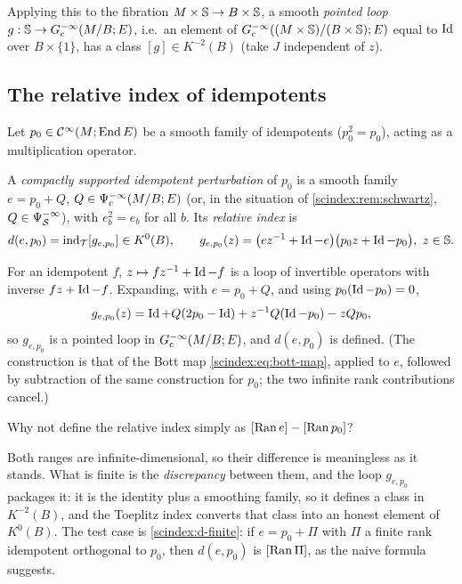 Applying this to the fibration $M\times\mathbb{S}\to B\times\mathbb{S}$, a smooth
\emph{pointed loop} $g:\mathbb{S}\to G^{-\infty}_{\mathrm c}(M/B;E)$, i.e.\ an element of
$G^{-\infty}_{\mathrm c}((M\times\mathbb{S})/(B\times\mathbb{S});E)$ equal to $\operatorname{Id}$ over
$B\times\{1\}$, has a class $[g]\in K^{-2}(B)$ (take $J$ independent of $z$).

\subsection{The relative index of idempotents}
Let $p_0\in\mathcal{C}^\infty(M;\operatorname{End} E)$ be a smooth family of idempotents ($p_0^2=p_0$), acting
as a multiplication operator.

\begin{definition}\label{scindex:def:d}
  A \emph{compactly supported idempotent perturbation} of $p_0$ is a smooth family
  $e=p_0+Q$, $Q\in\Psi^{-\infty}_{\mathrm c}(M/B;E)$ (or, in the situation of
  \cref{scindex:rem:schwartz}, $Q\in\Psi^{-\infty}_{\mathcal S}$), with
  $e_b^2=e_b$ for all $b$. Its \emph{relative index} is
  \begin{equation*}
    d(e,p_0)=\indT[g_{e,p_0}]\in K^0(B),\qquad
    g_{e,p_0}(z)=\bigl(ez^{-1}+\Id-e\bigr)\bigl(p_0z+\Id-p_0\bigr),\ z\in\Sphere.
  \end{equation*}
\end{definition}

For an idempotent $f$, $z\mapsto fz^{-1}+\operatorname{Id}-f$ is a loop of invertible operators
with inverse $fz+\operatorname{Id}-f$. Expanding, with $e=p_0+Q$, and using $p_0(\operatorname{Id}-p_0)=0$,
\begin{equation}\label{scindex:eq:loop-expansion}
  g_{e,p_0}(z)=\operatorname{Id}+Q(2p_0-\operatorname{Id})+z^{-1}Q(\operatorname{Id}-p_0)-zQp_0,
\end{equation}
so $g_{e,p_0}$ is a pointed loop in $G^{-\infty}_{\mathrm c}(M/B;E)$, and $d(e,p_0)$ is
defined. (The construction is that of the Bott map \eqref{scindex:eq:bott-map},
applied to $e$, followed by subtraction of the same construction for $p_0$; the
two infinite rank contributions cancel.)

\begin{question}
  Why not define the relative index simply as $[\operatorname{Ran} e]-[\operatorname{Ran} p_0]$?
\end{question}
\begin{answer}
  Both ranges are infinite-dimensional, so their difference is meaningless as it
  stands. What is finite is the \emph{discrepancy} between them, and the loop
  $g_{e,p_0}$ packages it: it is the identity plus a smoothing family, so it
  defines a class in $K^{-2}(B)$, and the Toeplitz index converts that class into
  an honest element of $K^0(B)$. The test case is
  \ref{scindex:d-finite}: if $e=p_0+\Pi$ with $\Pi$ a finite rank idempotent
  orthogonal to $p_0$, then $d(e,p_0)$ is $[\operatorname{Ran}\Pi]$, as the naive formula
  suggests.
\end{answer}

